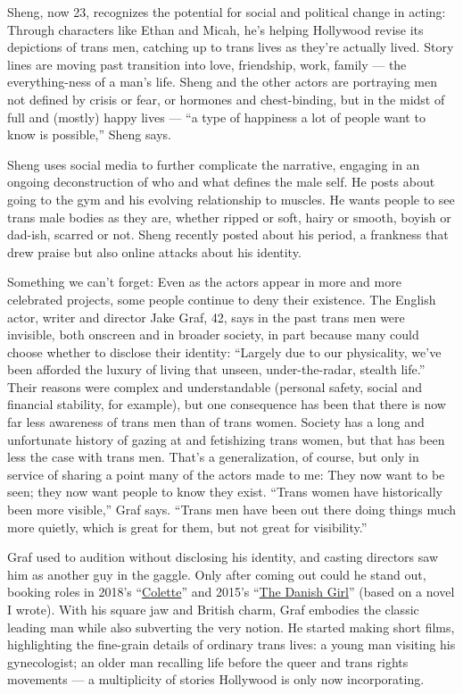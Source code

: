 Sheng, now 23, recognizes the potential for social and political change
in acting: Through characters like Ethan and Micah, he's helping
Hollywood revise its depictions of trans men, catching up to trans lives
as they're actually lived. Story lines are moving past transition into
love, friendship, work, family --- the everything-ness of a man's life.
Sheng and the other actors are portraying men not defined by crisis or
fear, or hormones and chest-binding, but in the midst of full and
(mostly) happy lives --- ``a type of happiness a lot of people want to
know is possible,'' Sheng says.

Sheng uses social media to further complicate the narrative, engaging in
an ongoing deconstruction of who and what defines the male self. He
posts about going to the gym and his evolving relationship to muscles.
He wants people to see trans male bodies as they are, whether ripped or
soft, hairy or smooth, boyish or dad-ish, scarred or not. Sheng recently
posted about his period, a frankness that drew praise but also online
attacks about his identity.

Something we can't forget: Even as the actors appear in more and more
celebrated projects, some people continue to deny their existence. The
English actor, writer and director Jake Graf, 42, says in the past trans
men were invisible, both onscreen and in broader society, in part
because many could choose whether to disclose their identity: ``Largely
due to our physicality, we've been afforded the luxury of living that
unseen, under-the-radar, stealth life.'' Their reasons were complex and
understandable (personal safety, social and financial stability, for
example), but one consequence has been that there is now far less
awareness of trans men than of trans women. Society has a long and
unfortunate history of gazing at and fetishizing trans women, but that
has been less the case with trans men. That's a generalization, of
course, but only in service of sharing a point many of the actors made
to me: They now want to be seen; they now want people to know they
exist. ``Trans women have historically been more visible,'' Graf says.
``Trans men have been out there doing things much more quietly, which is
great for them, but not great for visibility.''

Graf used to audition without disclosing his identity, and casting
directors saw him as another guy in the gaggle. Only after coming out
could he stand out, booking roles in 2018's
``\href{https://www.nytimes3xbfgragh.onion/2018/09/19/movies/colette-keira-knightley-costumes.html}{Colette}''
and 2015's
``\href{https://www.nytimes3xbfgragh.onion/2016/02/18/movies/oscars-2016-the-danish-girl-production-design.html}{The
Danish Girl}'' (based on a novel I wrote). With his square jaw and
British charm, Graf embodies the classic leading man while also
subverting the very notion. He started making short films, highlighting
the fine-grain details of ordinary trans lives: a young man visiting his
gynecologist; an older man recalling life before the queer and trans
rights movements --- a multiplicity of stories Hollywood is only now
incorporating.

